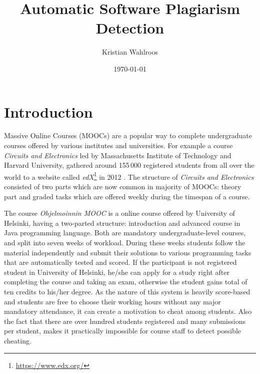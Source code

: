 \documentclass[english, grading]{tktltiki2}
\title{Automatic Software Plagiarism Detection}
\author{Kristian Wahlroos}
\date{\today}
\theoremstyle{definition}
\theoremstyle{remark}
\numberwithin{equation}{section} %
\begin{document}
 
\lstset{style=mystyle}



\frontmatter      %

\maketitle        %
\makeabstract     %

\tableofcontents  %


\mainmatter       %

\section{Introduction}


Massive Online Courses (MOOCs) are a popular way to complete undergraduate courses offered by various institutes and universities. For example a course \emph{Circuits and Electronics} led by Massachusetts Institute of Technology and Harvard University, gathered around 155\,000 registered students from all over the world to a website called \emph{edX}\footnote{\url{https://www.edx.org/}} in 2012 \cite{SLWCRFM2013}. The structure of \emph{Circuits and Electronics} consisted of two parts which are now common in majority of MOOCs: theory part and graded tasks which are offered weekly during the timespan of a course. 

The course \emph{Ohjelmoinnin MOOC} is a online course offered by University of Helsinki, having a two-parted structure: introduction and advanced course in Java programming language. Both are mandatory undergraduate-level courses, and split into seven weeks of workload. During these weeks students follow the material independently and submit their solutions to various programming tasks that are automatically tested and scored. If the participant is not registered student in University of Helsinki, he/she can apply for a study right after completing the course and taking an exam, otherwise the student gains total of ten credits to his/her degree. As the nature of this system is heavily score-based and students are free to choose their working hours without any major mandatory attendance, it can create a motivation to cheat among  students. Also the fact that there are over hundred students registered and many submissions per student, makes it practically impossible for course staff to detect possible cheating. 
\end{document}
